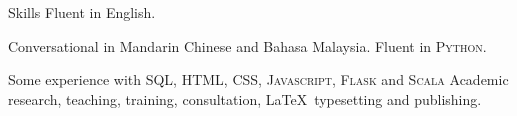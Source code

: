 
\begin{rubric}{Skills}
\entry*[Languages]
	Fluent in English. \par Conversational in Mandarin Chinese and Bahasa Malaysia.
	Fluent in \textsc{Python}. \par Some experience with SQL, \textsc{HTML, CSS, Javascript, Flask} and \textsc{Scala}
\entry*[Misc.]
	Academic research, teaching, training, consultation, \LaTeX\ typesetting and publishing.
\end{rubric}
